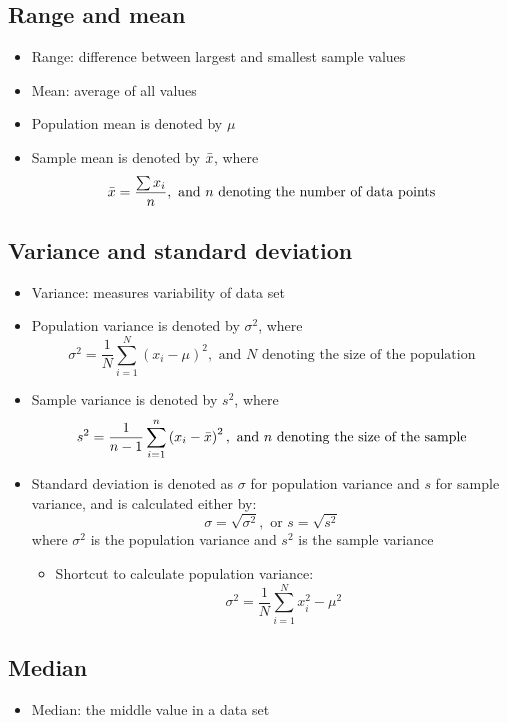\documentclass[a4paper]{article}
\begin{document}
\subsection{Range and mean}
\begin{itemize}
    \item Range: difference between largest and smallest sample values
    \item Mean: average of all values
    \newline
    \item Population mean is denoted by $\mu$
    \item Sample mean is denoted by $\Bar{x}$, where $$\Bar{x} = \frac{\sum x_{i}}{n}, \text{ and $n$ denoting the number of data points}$$
\end{itemize}
\subsection{Variance and standard deviation}
\begin{itemize}
    \item Variance: measures variability of data set
    \item Population variance is denoted by $\sigma^2$, where
    $$\sigma^2 = \frac{1}{N}\sum_{i=1}^{N}\left(x_{i}-\mu\right)^{2}, \text{ and $N$ denoting the size of the population}$$
    \item Sample variance is denoted by $s^2$, where
    $$s^2 = \frac{1}{n-1}\sum_{i=1}^{n}\left(x_{i}-\Bar{x}\right)^2, \text{ and $n$ denoting the size of the sample}$$
    \newline
    \item Standard deviation is denoted as $\sigma$ for population variance and $s$ for sample variance, and is calculated either by:
    $$\sigma = \sqrt{\sigma^2}, \text{ or } s = \sqrt{s^2}$$
    where $\sigma^2$ is the population variance and $s^2$ is the sample variance
    \begin{itemize}[label=$\circ$]
        \item Shortcut to calculate population variance:
        $$\sigma^2 = \frac{1}{N}\sum_{i=1}^{N}x_{i}^{2}-\mu^2$$
    \end{itemize}
\end{itemize}
\subsection{Median}
\begin{itemize}
    \item Median: the middle value in a data set
\end{itemize}
\end{document}
